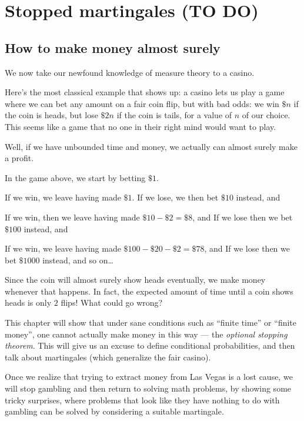 \chapter{Stopped martingales (TO DO)}
\label{ch:martingales}
\section{How to make money almost surely}
We now take our newfound knowledge of measure theory to a casino.

Here's the most classical example that shows up:
a casino lets us play a game where we can bet any amount
on a fair coin flip, but with bad odds:
we win $\$n$ if the coin is heads,
but lose $\$2n$ if the coin is tails,
for a value of $n$ of our choice.
This seems like a game that no one in their right mind would want to play.

Well, if we have unbounded time and money,
we actually can almost surely make a profit.
\begin{example}
	In the game above, we start by betting $\$1$.
	\begin{itemize}
		\ii If we win, we leave having made $\$1$.
		\ii If we lose, we then bet $\$10$ instead, and
		\begin{itemize}
			\ii If we win, then we leave having made $\$10-\$2=\$8$, and
			\ii If we lose then we bet $\$100$ instead, and
			\begin{itemize}
				\ii If we win, we leave having made $\$100-\$20-\$2=\$78$, and
				\ii If we lose then we bet $\$1000$ instead, and so on\dots
			\end{itemize}
		\end{itemize}
	\end{itemize}
	Since the coin will almost surely show heads eventually,
	we make money whenever that happens.
	In fact, the expected amount of time until a coin shows heads
	is only $2$ flips! What could go wrong?
\end{example}
This chapter will show that under sane conditions
such as ``finite time'' or ``finite money'',
one cannot actually make money in this way --- the \emph{optional stopping theorem}.
This will give us an excuse to define conditional probabilities,
and then talk about martingales (which generalize the fair casino).

Once we realize that trying to extract money from Las Vegas is a lost cause,
we will stop gambling and then return to solving math problems,
by showing some tricky surprises,
where problems that look like they have nothing to do with gambling
can be solved by considering a suitable martingale.

